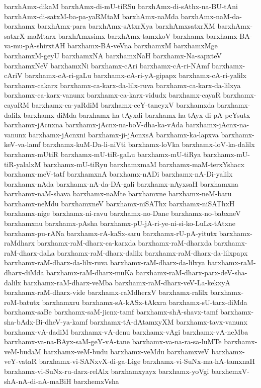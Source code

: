 {barxhAmx-dikaM
barxhAmx-di-mU-tiRSu
barxhAmx-di-sAthx-na-BU-tAni
barxhAmx-di-satxM-ba-pa-yaRMtaM
barxhAmx-naMda
barxhAmx-naM-da-barxhamx
barxhAmx-para
barxhAmx-sAtxrXya
barxhAmxsatxrXM
barxhAmx-satxrX-maMtarx
barxhAmxsimx
barxhAmx-tamxkoV
barxhamx
barxhamx-BA-va-mu-pA-shirxtAH
barxhamx-BA-veVna
barxhamxM
barxhamxMge
barxhamxM-geyU
barxhamxNA
barxhamxNaH
barxhamx-Na-sapxteV
barxhamxNeV
barxhamxNi
barxhamx-cAri
barxhamx-cA-ri-NAmf
barxhamx-cAriV
barxhamx-cA-ri-gaLu
barxhamx-cA-ri-yA-gipapx
barxhamx-cA-ri-yalilx
barxhamx-cakarx
barxhamx-ca-karx-da-lilx-ruva
barxhamx-ca-karx-da-lilxya
barxhamx-ca-karx-vanunx
barxhamx-ca-karx-vidudx
barxhamx-cayaR
barxhamx-cayaRM
barxhamx-ca-yaRdiM
barxhamx-ceY-taneyxV
barxhamxda
barxhamx-dalilx
barxhamx-diMda
barxhamx-ha-tAyxdi
barxhamx-ha-tAyx-di-pA-peYsutx
barxhamx-jAcnxna
barxhamx-jAcnx-na-boV-dha-ka-vAda
barxhamx-jAcnx-na-vanunx
barxhamx-jAcnxni
barxhamx-ji-jAcnxsA
barxhamx-ka-lapxva
barxhamx-keV-va-lamf
barxhamx-kuM-Da-li-niVti
barxhamx-loVka
barxhamx-loV-ka-dalilx
barxhamx-mUtiR
barxhamx-mU-tiR-gaLu
barxhamx-mU-tiRya
barxhamx-mU-tiR-yalalxM
barxhamx-mU-tiRyu
barxhamxmaM
barxhamx-maM-terxYshacx
barxhamx-meV-tatf
barxhamxnA
barxhamx-nADi
barxhamx-nA-Di-yalilx
barxhamx-nAda
barxhamx-nA-da-DA-gali
barxhamx-nAyxsaH
barxhamxna
barxhamx-naM-shava
barxhamx-naMte
barxhamxne
barxhamx-neM-baru
barxhamx-neMdu
barxhamxneV
barxhamx-niSAThx
barxhamx-niSAThxH
barxhamx-nige
barxhamx-ni-ravu
barxhamx-no-Dane
barxhamx-no-babxneV
barxhamxnu
barxhamx-pAsha
barxhamx-pU-jA-ri-ye-ni-si-ko-LuLx-tAtxne
barxhamx-pu-rANa
barxhamx-rA-kaSx-saru
barxhamx-rU-pA-yitutx
barxhamx-raMdharx
barxhamx-raM-dharx-ca-karxda
barxhamx-raM-dharxda
barxhamx-raM-dharx-daLa
barxhamx-raM-dharx-dalilx
barxhamx-raM-dharx-da-lilxpapx
barxhamx-raM-dharx-da-lilx-ruva
barxhamx-raM-dharx-da-lilxya
barxhamx-raM-dharx-diMda
barxhamx-raM-dharx-muKa
barxhamx-raM-dharx-parx-deV-sha-dalilx
barxhamx-raM-dharx-veMba
barxhamx-raM-dharx-veV-La-kekxyA
barxhamx-raM-dharx-vide
barxhamx-raMdherxV
barxhamx-ralilx
barxhamx-roM-batutx
barxhamxru
barxhamx-sA-kASx-tAkxra
barxhamx-sU-tarx-diMda
barxhamx-saBe
barxhamx-saM-jicnx-tamf
barxhamx-shA-shavx-tamf
barxhamx-sha-bAdx-Bi-dheV-ya-kamf
barxhamx-tA-dAtamxyXM
barxhamx-tavx-vanunx
barxhamx-vA-dadiM
barxhamx-vA-denu
barxhamx-vAgi
barxhamx-vA-neMba
barxhamx-va-na-BAyx-saM-geY-vA-tane
barxhamx-va-na-ra-sa-luMTe
barxhamx-veM-budaM
barxhamx-veM-budu
barxhamx-veMdu
barxhamxveV
barxhamx-veY-vataR
barxhamx-vi-SANxvX-di-ga-Lige
barxhamx-vi-SuNx-ma-hA-tamxnaH
barxhamx-vi-SuNx-ru-darx-relAlx
barxhamxyayx
barxhamx-yoVgi
barxhemxV-shA-nA-di-nA-maBiH
barxhemxVsha
}
